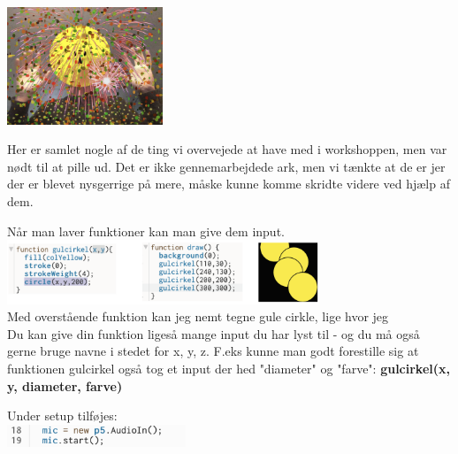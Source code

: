 \documentclass{ucph-handout}
\newcounter{handout}
\newcommand{\Ark}{Ark \#\arabic{handout} -- }
\begin{document}
\begin{exercisebox}[adjusted title=Tjek betingelse med \textit{if-statement}]
\hspace{4.5cm} \includegraphics[width=0.35\textwidth]{nyebilleder/fest.png} \\

\end{exercisebox}

\newpage
{}
\renewcommand{\Title}{\Ark Appendix}%



\begin{exercisebox}[adjusted title= APPENDIX]
Her er samlet nogle af de ting vi overvejede at have med i workshoppen, men var nødt til at pille ud. Det er ikke gennemarbejdede ark, men vi tænkte at de er jer der er blevet nysgerrige på mere, måske kunne komme skridte videre ved hjælp af dem. 
\vspace{3mm}

Når man laver funktioner kan man give dem input. \\

\includegraphics[width=0.7\textwidth]{billeder/treien.png} \\
Med overstående funktion kan jeg nemt tegne gule cirkle, lige hvor jeg \\

Du kan give din funktion ligeså mange input du har lyst til - og du må også gerne bruge navne i stedet for x, y, z. F.eks kunne man godt forestille sig at funktionen gulcirkel også tog et input der hed "diameter" og "farve": \textbf{gulcirkel(x, y, diameter, farve)}
\vspace{3mm}

Under setup tilføjes:\\

\includegraphics[width=0.4\textwidth]{billeder/micstart.png}\\


\end{exercisebox}
\end{document}
